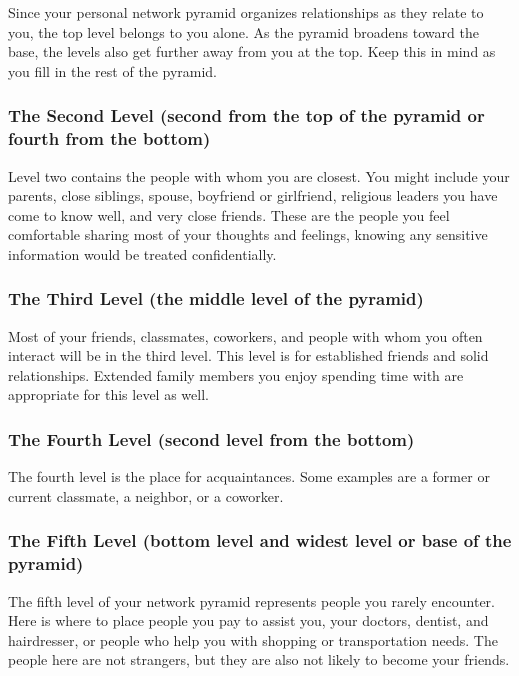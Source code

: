 Since your personal network pyramid organizes relationships as they relate to you, the top level belongs to you alone. As the pyramid broadens toward the base, the levels also get further away from you at the top. Keep this in mind as you fill in the rest of the pyramid.

\subsubsection*{The Second Level (second from the top of the pyramid or fourth from the bottom)}

Level two contains the people with whom you are closest. You might include your parents, close siblings, spouse, boyfriend or girlfriend, religious leaders you have come to know well, and very close friends. These are the people you feel comfortable sharing most of your thoughts and feelings, knowing any sensitive information would be treated confidentially.

\subsubsection*{The Third Level (the middle level of the pyramid)}

Most of your friends, classmates, coworkers, and people with whom you often interact will be in the third level. This level is for established friends and solid relationships. Extended family members you enjoy spending time with are appropriate for this level as well.

\subsubsection*{The Fourth Level (second level from the bottom)}

The fourth level is the place for acquaintances. Some examples are a former or current classmate, a neighbor, or a coworker.

\subsubsection*{The Fifth Level (bottom level and widest level or base of the pyramid)}

The fifth level of your network pyramid represents people you rarely encounter. Here is where to place people you pay to assist you, your doctors, dentist, and hairdresser, or people who help you with shopping or transportation needs. The people here are not strangers, but they are also not likely to become your friends. 

